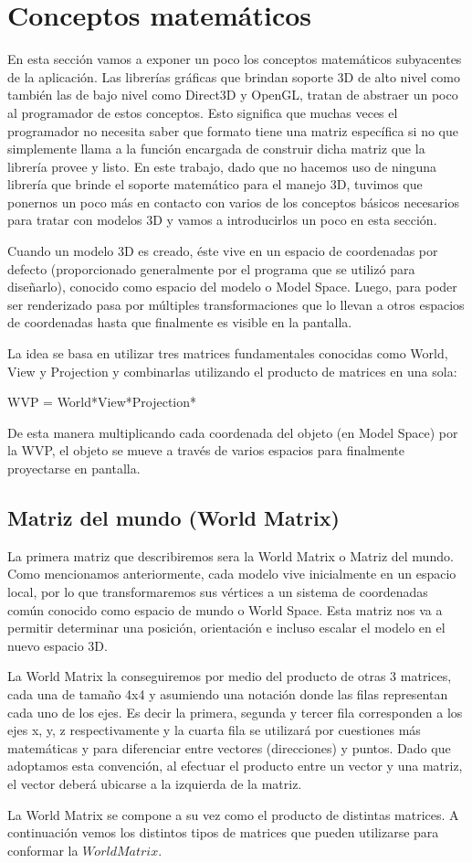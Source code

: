 \documentclass[a4paper]{article}
\begin{document}
\section{Conceptos matemáticos}
En esta sección vamos a exponer un poco los conceptos matemáticos subyacentes de la aplicación. Las librerías gráficas que brindan soporte 3D de alto nivel como también las de bajo nivel como Direct3D y OpenGL, tratan de abstraer un poco al programador de estos conceptos. Esto significa que muchas veces el programador no necesita saber que formato tiene una matriz específica si no que simplemente llama a la función encargada de construir dicha matriz que la librería provee y listo. En este trabajo, dado que no hacemos uso de ninguna librería que brinde el soporte matemático para el manejo 3D, tuvimos que ponernos un poco más en contacto con varios de los conceptos básicos necesarios para tratar con modelos 3D y vamos a introducirlos un poco en esta sección.

Cuando un modelo 3D es creado, éste vive en un espacio de coordenadas por defecto (proporcionado generalmente por el programa que se utilizó para diseñarlo), conocido como espacio del modelo o Model Space. Luego, para poder ser renderizado pasa por múltiples transformaciones que lo llevan a otros espacios de coordenadas hasta que finalmente es visible en la pantalla. 
\par La idea se basa en utilizar tres matrices fundamentales conocidas como World, View y Projection y combinarlas utilizando el producto de matrices en una sola: 

WVP = World*View*Projection*

De esta manera  multiplicando cada coordenada del objeto (en Model Space) por la WVP, el objeto se mueve a través de varios espacios para finalmente proyectarse en pantalla.

\subsection{Matriz del mundo (World Matrix)}
La primera matriz que describiremos sera la  World Matrix o Matriz del mundo.
Como mencionamos anteriormente, cada modelo vive inicialmente en un espacio local,  por lo que transformaremos sus vértices a un sistema de coordenadas común conocido como espacio de mundo o World Space. Esta matriz nos va a permitir determinar una posición,  orientación e incluso escalar el modelo en el nuevo espacio 3D.
\par La World Matrix la conseguiremos por medio del producto de otras 3 matrices, cada una de tamaño 4x4 y asumiendo una notación donde las filas representan cada uno de los ejes. Es decir la primera, segunda y tercer fila corresponden a los ejes x, y, z respectivamente y la cuarta fila se utilizará por cuestiones más matemáticas y para diferenciar entre vectores (direcciones) y puntos. Dado que adoptamos esta convención, al efectuar el producto entre un vector y una matriz, el vector deberá ubicarse a la izquierda de la matriz.
\par La World Matrix se compone a su vez como el producto de distintas matrices. A continuación vemos los distintos tipos de matrices que pueden utilizarse para conformar la $World Matrix$.
\end{document}
